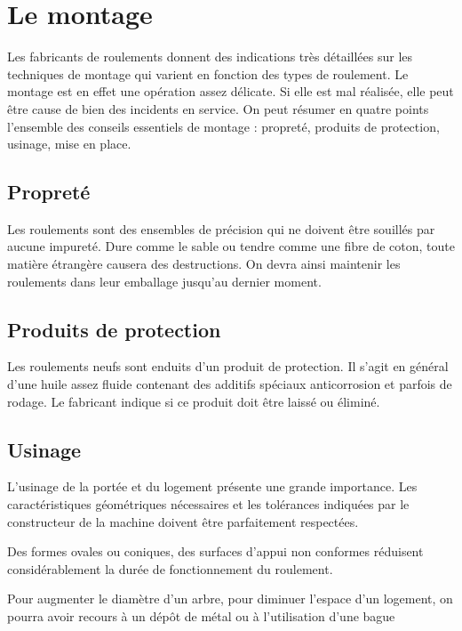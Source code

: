 \section{Le montage}


Les fabricants de roulements donnent des indications très détaillées sur les techniques de montage qui varient en fonction des types de roulement. Le montage est en effet une opération assez délicate. Si elle est mal réalisée, elle peut être cause de bien des incidents en service.
On peut résumer en quatre points l’ensemble des conseils essentiels de montage : propreté, produits de protection, usinage, mise en place.


\subsection{Propreté }

Les roulements sont des ensembles de précision qui ne doivent être souillés par aucune impureté. Dure comme le sable ou tendre comme une fibre de coton, toute matière étrangère causera des destructions. On devra ainsi maintenir les roulements dans leur emballage jusqu’au dernier moment.


\subsection{Produits de protection} 

Les roulements neufs sont enduits d’un produit de protection. Il s’agit en général d’une huile assez fluide contenant des additifs spéciaux anticorrosion et parfois de rodage. Le fabricant indique si ce produit doit être laissé ou éliminé.


\subsection{Usinage}

L’usinage de la portée et du logement présente une grande importance. Les caractéristiques géométriques nécessaires et les tolérances indiquées par le constructeur de la machine doivent être parfaitement respectées.
\vspace{0.3cm}

Des formes ovales ou coniques, des surfaces d’appui non conformes réduisent considérablement la durée de fonctionnement du roulement.
\vspace{0.3cm}

Pour augmenter le diamètre d’un arbre, pour diminuer l’espace d’un logement, on pourra avoir recours à un dépôt de métal ou à l’utilisation d’une bague 




